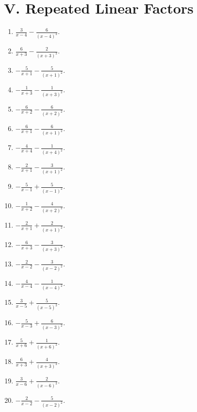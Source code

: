 \documentclass[11pt,oneside]{book}
\begin{document}
\section*{V. Repeated Linear Factors}
\begin{enumerate}[leftmargin=*,label=\textbf{V\arabic*.},itemsep=0.45\baselineskip]
\item $\displaystyle \frac{3}{x - 4} - \frac{6}{\left(x - 4\right)^{2}}$.
\item $\displaystyle \frac{6}{x + 3} - \frac{2}{\left(x + 3\right)^{2}}$.
\item $\displaystyle - \frac{5}{x + 1} - \frac{5}{\left(x + 1\right)^{2}}$.
\item $\displaystyle - \frac{1}{x + 3} - \frac{1}{\left(x + 3\right)^{2}}$.
\item $\displaystyle - \frac{6}{x + 2} - \frac{6}{\left(x + 2\right)^{2}}$.
\item $\displaystyle - \frac{6}{x + 1} - \frac{6}{\left(x + 1\right)^{2}}$.
\item $\displaystyle - \frac{4}{x + 4} - \frac{1}{\left(x + 4\right)^{2}}$.
\item $\displaystyle - \frac{2}{x + 1} - \frac{3}{\left(x + 1\right)^{2}}$.
\item $\displaystyle - \frac{5}{x - 1} + \frac{5}{\left(x - 1\right)^{2}}$.
\item $\displaystyle - \frac{1}{x + 2} - \frac{4}{\left(x + 2\right)^{2}}$.
\item $\displaystyle - \frac{2}{x + 1} + \frac{2}{\left(x + 1\right)^{2}}$.
\item $\displaystyle - \frac{6}{x + 3} - \frac{3}{\left(x + 3\right)^{2}}$.
\item $\displaystyle - \frac{2}{x - 2} - \frac{3}{\left(x - 2\right)^{2}}$.
\item $\displaystyle - \frac{4}{x - 4} - \frac{1}{\left(x - 4\right)^{2}}$.
\item $\displaystyle \frac{3}{x - 5} + \frac{5}{\left(x - 5\right)^{2}}$.
\item $\displaystyle - \frac{5}{x - 3} + \frac{6}{\left(x - 3\right)^{2}}$.
\item $\displaystyle \frac{5}{x + 6} + \frac{1}{\left(x + 6\right)^{2}}$.
\item $\displaystyle \frac{6}{x + 3} + \frac{4}{\left(x + 3\right)^{2}}$.
\item $\displaystyle \frac{3}{x - 6} + \frac{2}{\left(x - 6\right)^{2}}$.
\item $\displaystyle - \frac{2}{x - 2} - \frac{5}{\left(x - 2\right)^{2}}$.

\end{enumerate}
\end{document}
